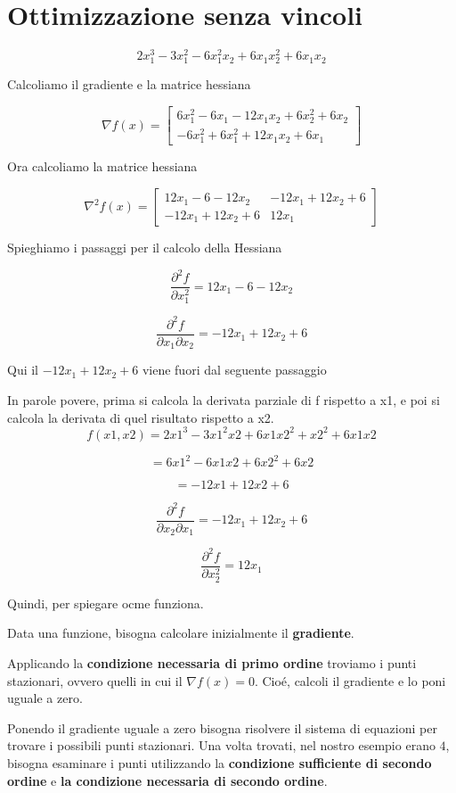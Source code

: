 \section{Ottimizzazione senza vincoli}


$$
2x_1^3 - 3x_1^2 -6x_1^2x_2 +6x_1x_2^2 +6x_1x_2
$$

Calcoliamo il gradiente e la matrice hessiana

$$
\nabla f(x) = \begin{bmatrix}
6x_1^2 - 6x_1 - 12x_1x_2 + 6x_2^2 + 6x_2 \\
-6x_1^2 + 6x_1^2 + 12x_1x_2 + 6x_1 
\end{bmatrix}
$$

Ora calcoliamo la matrice hessiana

$$
\nabla^2 f(x) = \begin{bmatrix}
12x_1 - 6 - 12x_2 & -12x_1 + 12x_2 + 6 \\
-12x_1 + 12x_2 + 6 & 12x_1
\end{bmatrix}
$$

Spieghiamo i passaggi per il calcolo della Hessiana

$$
\frac{\partial^2 f}{\partial x_1^2} = 12x_1 - 6 - 12x_2
$$

$$
\frac{\partial^2 f}{\partial x_1 \partial x_2} = -12x_1 + 12x_2 + 6
$$

Qui il $-12x_1 + 12x_2 + 6$ viene fuori dal seguente passaggio

In parole povere, prima si calcola la derivata parziale di f rispetto a x1, e poi si calcola la derivata di quel risultato rispetto a x2.
$$
f(x1, x2) = 2x1^3 - 3x1^2x2 + 6x1x2^2 + x2^2 + 6x1x2
$$

$$
= 6x1^2 - 6x1x2 + 6x2^2 + 6x2
$$

$$
= -12x1 + 12x2 + 6
$$


$$
\frac{\partial^2 f}{\partial x_2 \partial x_1} = -12x_1 + 12x_2 + 6
$$

$$
\frac{\partial^2 f}{\partial x_2^2} = 12x_1
$$

Quindi, per spiegare ocme funziona.

Data una funzione, bisogna calcolare inizialmente il \textbf{gradiente}.

Applicando la \textbf{condizione necessaria di primo ordine} troviamo i punti stazionari, ovvero quelli in 
cui il $\nabla f(x) = 0$. Cioé, calcoli il gradiente e lo poni uguale a zero.

Ponendo il gradiente uguale a zero bisogna risolvere il sistema di equazioni per trovare 
i possibili punti stazionari. Una volta trovati, nel nostro esempio erano $4$, 
bisogna esaminare i punti utilizzando la \textbf{condizione sufficiente di secondo ordine} e \textbf{la condizione necessaria di secondo ordine}.

